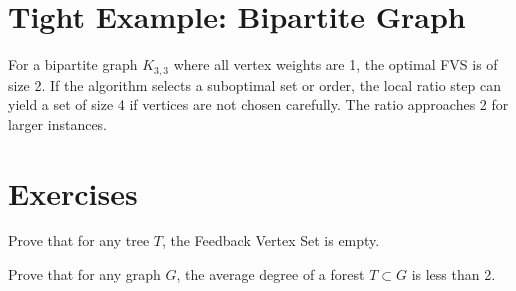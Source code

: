 \section{Tight Example: Bipartite Graph}
For a bipartite graph $K_{3,3}$ where all vertex weights are 1, the optimal FVS is of size 2. If the algorithm selects a suboptimal set or order, the local ratio step can yield a set of size 4 if vertices are not chosen carefully. The ratio approaches 2 for larger instances.

\section{Exercises}
\begin{exercise}
Prove that for any tree $T$, the Feedback Vertex Set is empty.
\end{exercise}
\begin{exercise}
Prove that for any graph $G$, the average degree of a forest $T \subset G$ is less than 2.
\end{exercise}

